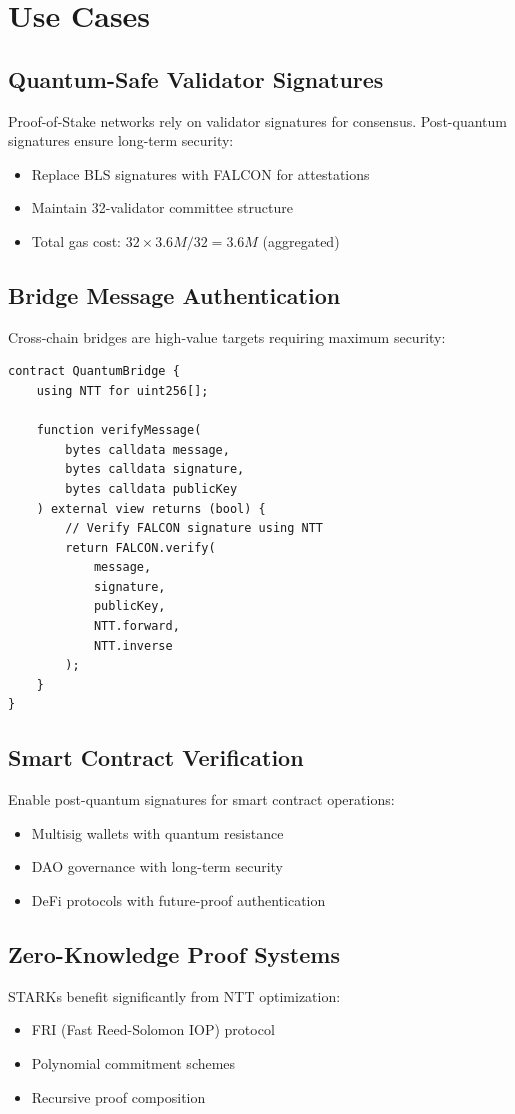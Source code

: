 \section{Use Cases}


\subsection{Quantum-Safe Validator Signatures}

Proof-of-Stake networks rely on validator signatures for consensus. Post-quantum signatures ensure long-term security:

\begin{itemize}
\item Replace BLS signatures with FALCON for attestations
\item Maintain 32-validator committee structure
\item Total gas cost: $32 \times 3.6M / 32 = 3.6M$ (aggregated)
\end{itemize}

\subsection{Bridge Message Authentication}

Cross-chain bridges are high-value targets requiring maximum security:

\begin{lstlisting}[caption={Bridge Message Verification}]
contract QuantumBridge {
    using NTT for uint256[];

    function verifyMessage(
        bytes calldata message,
        bytes calldata signature,
        bytes calldata publicKey
    ) external view returns (bool) {
        // Verify FALCON signature using NTT
        return FALCON.verify(
            message,
            signature,
            publicKey,
            NTT.forward,
            NTT.inverse
        );
    }
}
\end{lstlisting}

\subsection{Smart Contract Verification}

Enable post-quantum signatures for smart contract operations:

\begin{itemize}
\item Multisig wallets with quantum resistance
\item DAO governance with long-term security
\item DeFi protocols with future-proof authentication
\end{itemize}

\subsection{Zero-Knowledge Proof Systems}

STARKs benefit significantly from NTT optimization:

\begin{itemize}
\item FRI (Fast Reed-Solomon IOP) protocol
\item Polynomial commitment schemes
\item Recursive proof composition
\end{itemize}

